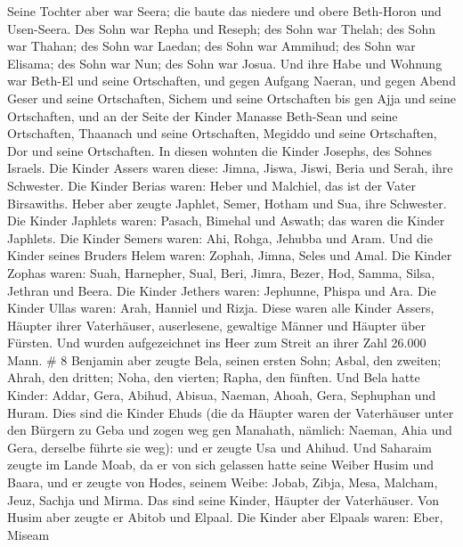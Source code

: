  Seine Tochter aber war Seera; die baute das niedere und
obere Beth-Horon und Usen-Seera.  Des Sohn war Repha und
Reseph; des Sohn war Thelah; des Sohn war Thahan;  des Sohn
war Laedan; des Sohn war Ammihud; des Sohn war Elisama; 
des Sohn war Nun; des Sohn war Josua.  Und ihre Habe und
Wohnung war Beth-El und seine Ortschaften, und gegen Aufgang Naeran, und
gegen Abend Geser und seine Ortschaften, Sichem und seine Ortschaften
bis gen Ajja und seine Ortschaften,  und an der Seite der
Kinder Manasse Beth-Sean und seine Ortschaften, Thaanach und seine
Ortschaften, Megiddo und seine Ortschaften, Dor und seine Ortschaften.
In diesen wohnten die Kinder Josephs, des Sohnes Israels. 
Die Kinder Assers waren diese: Jimna, Jiswa, Jiswi, Beria und Serah,
ihre Schwester.  Die Kinder Berias waren: Heber und
Malchiel, das ist der Vater Birsawiths.  Heber aber zeugte
Japhlet, Semer, Hotham und Sua, ihre Schwester.  Die Kinder
Japhlets waren: Pasach, Bimehal und Aswath; das waren die Kinder
Japhlets.  Die Kinder Semers waren: Ahi, Rohga, Jehubba und
Aram.  Und die Kinder seines Bruders Helem waren: Zophah,
Jimna, Seles und Amal.  Die Kinder Zophas waren: Suah,
Harnepher, Sual, Beri, Jimra,  Bezer, Hod, Samma, Silsa,
Jethran und Beera.  Die Kinder Jethers waren: Jephunne,
Phispa und Ara.  Die Kinder Ullas waren: Arah, Hanniel und
Rizja.  Diese waren alle Kinder Assers, Häupter ihrer
Vaterhäuser, auserlesene, gewaltige Männer und Häupter über Fürsten. Und
wurden aufgezeichnet ins Heer zum Streit an ihrer Zahl 26.000 Mann. \# 8
 Benjamin aber zeugte Bela, seinen ersten Sohn; Asbal, den
zweiten; Ahrah, den dritten;  Noha, den vierten; Rapha, den
fünften.  Und Bela hatte Kinder: Addar, Gera, Abihud,
 Abisua, Naeman, Ahoah,  Gera, Sephuphan und
Huram.  Dies sind die Kinder Ehuds (die da Häupter waren der
Vaterhäuser unter den Bürgern zu Geba und zogen weg gen Manahath,
 nämlich: Naeman, Ahia und Gera, derselbe führte sie weg):
und er zeugte Usa und Ahihud.  Und Saharaim zeugte im Lande
Moab, da er von sich gelassen hatte seine Weiber Husim und Baara,
 und er zeugte von Hodes, seinem Weibe: Jobab, Zibja, Mesa,
Malcham,  Jeuz, Sachja und Mirma. Das sind seine Kinder,
Häupter der Vaterhäuser.  Von Husim aber zeugte er Abitob
und Elpaal.  Die Kinder aber Elpaals waren: Eber, Miseam
